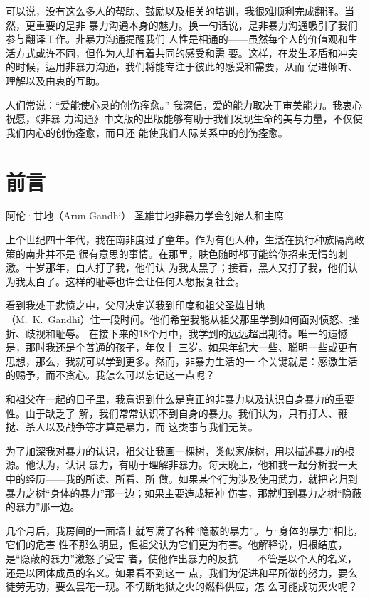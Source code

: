 \documentclass{ctexart}
\begin{document}
可以说，没有这么多人的帮助、鼓励以及相关的培训，我很难顺利完成翻译。当然，更重要的是非
暴力沟通本身的魅力。换一句话说，是非暴力沟通吸引了我们参与翻译工作。非暴力沟通提醒我们
人性是相通的------虽然每个人的价值观和生活方式或许不同，但作为人却有着共同的感受和需
要。这样，在发生矛盾和冲突的时候，运用非暴力沟通，我们将能专注于彼此的感受和需要，从而
促进倾听、理解以及由衷的互助。

人们常说：``爱能使心灵的创伤痊愈。'' 我深信，爱的能力取决于审美能力。我衷心祝愿，《非暴
力沟通》中文版的出版能够有助于我们发现生命的美与力量，不仅使我们内心的创伤痊愈，而且还
能使我们人际关系中的创伤痊愈。


\section{前言}\label{sec:前言}

阿伦·甘地（Arun Gandhi） 圣雄甘地非暴力学会创始人和主席

上个世纪四十年代，我在南非度过了童年。作为有色人种，生活在执行种族隔离政策的南非并不是
很有意思的事情。在那里，肤色随时都可能给你招来无情的刺激。十岁那年，白人打了我，他们认
为我太黑了；接着，黑人又打了我，他们认为我太白了。这样的耻辱也许会让任何人想报复社会。

看到我处于悲愤之中，父母决定送我到印度和祖父圣雄甘地\\
（M.~K.~Gandhi）住一段时间。他们希望我能从祖父那里学到如何面对愤怒、挫折、歧视和耻辱。
在接下来的18个月中，我学到的远远超出期待。唯一的遗憾是，那时我还是个普通的孩子，年仅十
三岁。如果年纪大一些、聪明一些或更有思想，那么，我就可以学到更多。然而，非暴力生活的一
个关键就是：感激生活的赐予，而不贪心。我怎么可以忘记这一点呢？

和祖父在一起的日子里，我意识到什么是真正的非暴力以及认识自身暴力的重要性。由于缺乏了
解，我们常常认识不到自身的暴力。我们认为，只有打人、鞭挞、杀人以及战争等才算是暴力，而
这类事与我们无关。

为了加深我对暴力的认识，祖父让我画一棵树，类似家族树，用以描述暴力的根源。他认为，认识
暴力，有助于理解非暴力。每天晚上，他和我一起分析我一天中的经历------我的所读、所看、所
做。如果某个行为涉及使用武力，就把它归到暴力之树``身体的暴力''那一边；如果主要造成精神
伤害，那就归到暴力之树``隐蔽的暴力''那一边。

几个月后，我房间的一面墙上就写满了各种``隐蔽的暴力''。与``身体的暴力''相比，它们的危害
性不那么明显，但祖父认为它们更为有害。他解释说，归根结底，是``隐蔽的暴力''激怒了受害
者，使他作出暴力的反抗------不管是以个人的名义，还是以团体成员的名义。如果看不到这一
点，我们为促进和平所做的努力，要么徒劳无功，要么昙花一现。不切断地狱之火的燃料供应，怎
么可能成功灭火呢？
\end{document}
